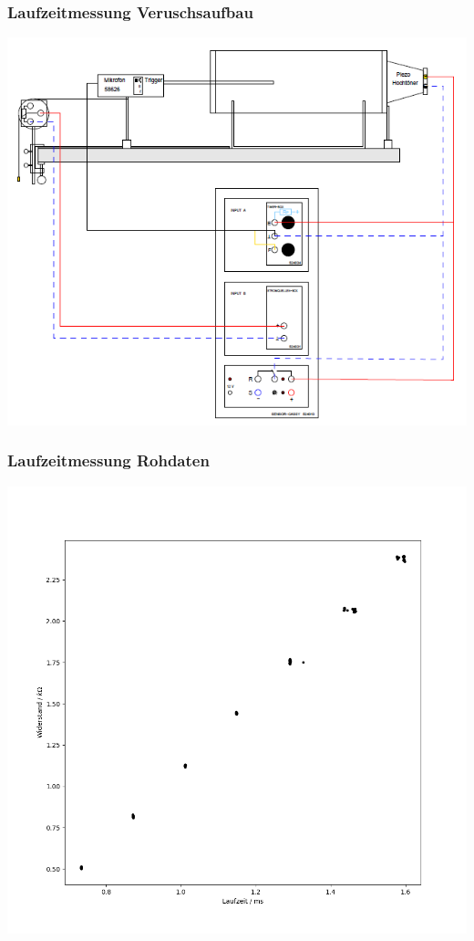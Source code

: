 \documentclass[12pt]{beamer}
\begin{document}
	\begin{frame}
		\frametitle{Laufzeitmessung \qquad Veruschsaufbau}
		\begin{center}
			\includegraphics[width=0.8\linewidth]{aufbau_laufzeitmessung}
		\end{center}
	\end{frame}

	\begin{frame}
		\frametitle{Laufzeitmessung \qquad Rohdaten}
		\begin{center}
			\includegraphics[width=0.75\linewidth]{rohdaten_laufzeit}
		\end{center}
	\end{frame}
\end{document}
